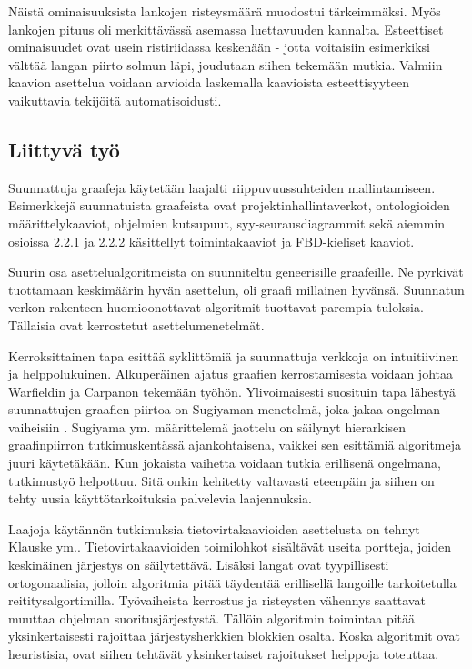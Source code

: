 \documentclass[finnish,12pt]{article}
\begin{document}
Näistä ominaisuuksista lankojen risteysmäärä muodostui tärkeimmäksi. Myös lankojen pituus oli merkittävässä asemassa luettavuuden kannalta.
Esteettiset ominaisuudet ovat usein ristiriidassa keskenään - jotta voitaisiin esimerkiksi välttää langan piirto solmun läpi, joudutaan siihen tekemään mutkia.
Valmiin kaavion asettelua voidaan arvioida laskemalla kaavioista esteettisyyteen vaikuttavia tekijöitä automatisoidusti.


	\subsection{Liittyvä työ}

Suunnattuja graafeja käytetään laajalti riippuvuussuhteiden mallintamiseen.
Esimerkkejä suunnatuista graafeista ovat projektinhallintaverkot, ontologioiden määrittelykaaviot, ohjelmien kutsupuut, syy-seurausdiagrammit sekä aiemmin osioissa 2.2.1 ja 2.2.2 käsittellyt toimintakaaviot ja FBD-kieliset kaaviot.

Suurin osa asettelualgoritmeista on suunniteltu geneerisille graafeille.
Ne pyrkivät tuottamaan keskimäärin hyvän asettelun, oli graafi millainen hyvänsä.
Suunnatun verkon rakenteen huomioonottavat algoritmit tuottavat parempia tuloksia.
Tällaisia ovat kerrostetut asettelumenetelmät.

Kerroksittainen tapa esittää syklittömiä ja suunnattuja verkkoja on intuitiivinen ja helppolukuinen.
Alkuperäinen ajatus graafien kerrostamisesta voidaan johtaa Warfieldin \cite{RefWorks:58} ja Carpanon \cite{RefWorks:57} tekemään työhön.
Ylivoimaisesti suosituin tapa lähestyä suunnattujen graafien piirtoa on Sugiyaman menetelmä, joka jakaa ongelman vaiheisiin \cite{RefWorks:9}.
Sugiyama ym. määrittelemä jaottelu on säilynyt hierarkisen graafinpiirron tutkimuskentässä ajankohtaisena, vaikkei sen esittämiä algoritmeja juuri käytetäkään.
Kun jokaista vaihetta voidaan tutkia erillisenä ongelmana, tutkimustyö helpottuu.
Sitä onkin kehitetty valtavasti eteenpäin ja siihen on tehty uusia käyttötarkoituksia palvelevia laajennuksia.

Laajoja käytännön tutkimuksia tietovirtakaavioiden asettelusta on tehnyt Klauske ym.\cite{RefWorks:50}.
Tietovirtakaavioiden toimilohkot sisältävät useita portteja, joiden keskinäinen järjestys on säilytettävä.
Lisäksi langat ovat tyypillisesti ortogonaalisia, jolloin algoritmia pitää täydentää erillisellä langoille tarkoitetulla reititysalgortimilla.
Työvaiheista kerrostus ja risteysten vähennys saattavat muuttaa ohjelman suoritusjärjestystä.
Tällöin algoritmin toimintaa pitää yksinkertaisesti rajoittaa järjestysherkkien blokkien osalta.
Koska algoritmit ovat heuristisia, ovat siihen tehtävät yksinkertaiset rajoitukset helppoja toteuttaa.
\end{document}
